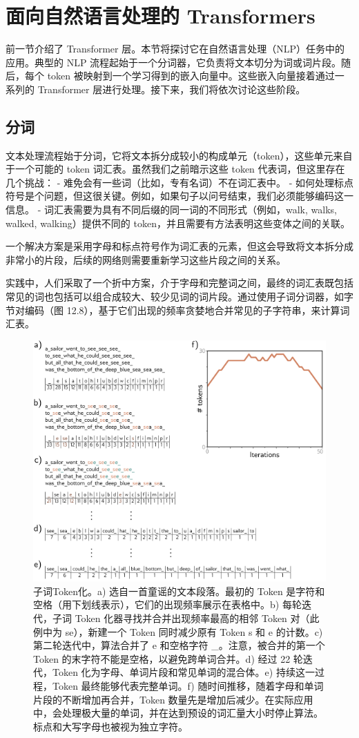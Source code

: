 \section{面向自然语言处理的 Transformers}

前一节介绍了 Transformer 层。本节将探讨它在自然语言处理（NLP）任务中的应用。典型的 NLP 流程起始于一个分词器，它负责将文本切分为词或词片段。随后，每个 token 被映射到一个学习得到的嵌入向量中。这些嵌入向量接着通过一系列的 Transformer 层进行处理。接下来，我们将依次讨论这些阶段。

\subsection{分词}
文本处理流程始于分词，它将文本拆分成较小的构成单元（token），这些单元来自于一个可能的 token 词汇表。虽然我们之前暗示这些 token 代表词，但这里存在几个挑战：
- 难免会有一些词（比如，专有名词）不在词汇表中。
- 如何处理标点符号是个问题，但这很关键。例如，如果句子以问号结束，我们必须能够编码这一信息。
- 词汇表需要为具有不同后缀的同一词的不同形式（例如，walk, walks, walked, walking）提供不同的 token，并且需要有方法表明这些变体之间的关联。

一个解决方案是采用字母和标点符号作为词汇表的元素，但这会导致将文本拆分成非常小的片段，后续的网络则需要重新学习这些片段之间的关系。

实践中，人们采取了一个折中方案，介于字母和完整词之间，最终的词汇表既包括常见的词也包括可以组合成较大、较少见词的词片段。通过使用子词分词器，如字节对编码（图 12.8），基于它们出现的频率贪婪地合并常见的子字符串，来计算词汇表。

\begin{figure}[ht!]
\centering
\includegraphics[width=0.7\linewidth]{png/chapter12/TransformerBPE.png}
\caption{子词Token化。a) 选自一首童谣的文本段落。最初的 Token 是字符和空格（用下划线表示），它们的出现频率展示在表格中。b) 每轮迭代，子词 Token 化器寻找并合并出现频率最高的相邻 Token 对（此例中为 se），新建一个 Token 同时减少原有 Token s 和 e 的计数。c) 第二轮迭代中，算法合并了 e 和空格字符 \_。注意，被合并的第一个 Token 的末字符不能是空格，以避免跨单词合并。d) 经过 22 轮迭代，Token 化为字母、单词片段和常见单词的混合体。e) 持续这一过程，Token 最终能够代表完整单词。f) 随时间推移，随着字母和单词片段的不断增加再合并，Token 数量先是增加后减少。在实际应用中，会处理极大量的单词，并在达到预设的词汇量大小时停止算法。标点和大写字母也被视为独立字符。}
\end{figure}


